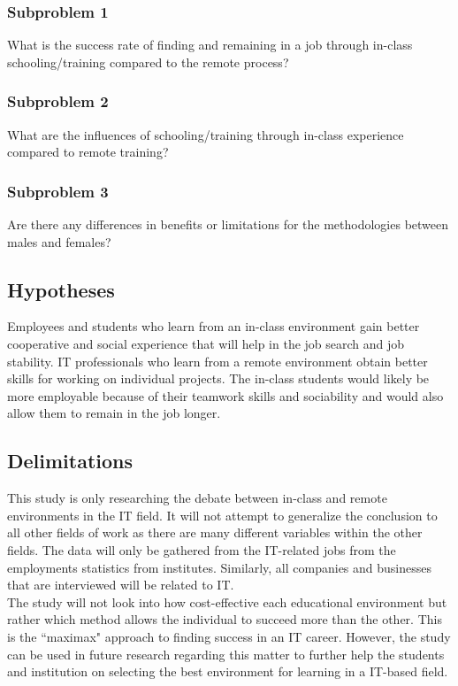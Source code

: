 \documentclass[titlepage]{article}
\begin{document}
\subsubsection{Subproblem 1}
What is the success rate of finding and remaining in a job through in-class
schooling/training compared to the remote process?

\subsubsection{Subproblem 2}
What are the influences of schooling/training through in-class experience
compared to remote training?

\subsubsection{Subproblem 3}
Are there any differences in benefits or limitations for the methodologies between males
and females?

\subsection{Hypotheses}

Employees and students who learn from an in-class environment gain better cooperative and
social experience that will help in the job search and job stability.  IT professionals who
learn from a remote environment obtain better skills for working on individual projects.  
The in-class students would likely be more employable because of their teamwork skills and
sociability and would also allow them to remain in the job longer.

\clearpage

\subsection{Delimitations}
This study is only researching the debate between in-class and remote environments in the
IT field.  It will not attempt to generalize the conclusion to all other fields of work
as there are many different variables within the other fields.  The data will only be gathered
from the IT-related jobs from the employments statistics from institutes.  Similarly, all
companies and businesses that are interviewed will be related to IT.\\

\noindent The study will not look into how cost-effective each educational environment but rather which
method allows the individual to succeed more than the other.  This is the ``maximax" approach
to finding success in an IT career. However, the study can be used in future research regarding 
this matter to further help the students and institution on selecting the best environment 
for learning in a IT-based field.
\end{document}

